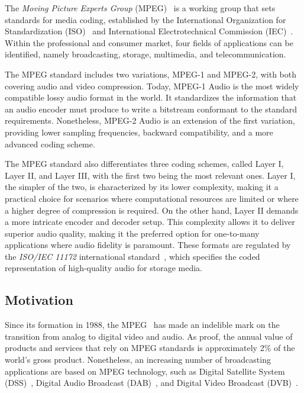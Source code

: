 The \textit{Moving Picture Experts Group} (MPEG)~\cite{MPEG} is a working group that sets standards for media coding, established by the International Organization for Standardization (ISO)~\cite{iso} and International Electrotechnical Commission (IEC)~\cite{iec}. Within the professional and consumer market, four fields of applications can be identified, namely broadcasting, storage, multimedia, and telecommunication.

The MPEG standard includes two variations, MPEG-1 and MPEG-2, with both covering audio and video compression.  Today, MPEG-1 Audio is the most widely compatible lossy audio format in the world. It standardizes the information that an audio encoder must produce to write a bitstream conformant to the standard requirements.  Nonetheless, MPEG-2 Audio is an extension of the first variation, providing lower sampling frequencies, backward compatibility, and a more advanced coding scheme.

The MPEG standard also differentiates three coding schemes, called Layer I, Layer II, and Layer III, with the first two being the most relevant ones. 
Layer I, the simpler of the two, is characterized by its lower complexity, making it a practical choice for scenarios where computational resources are limited or where a higher degree of compression is required.
On the other hand, Layer II demands a more intricate encoder and decoder setup. This complexity allows it to deliver superior audio quality, making it the preferred option for one-to-many applications where audio fidelity is paramount.
These formats are regulated by the \textit{ISO/IEC 11172} international standard~\cite{11172}, which specifies the coded representation of high-quality audio for storage media.

\subsection{Motivation}

Since its formation in 1988, the MPEG~\cite{MPEG} has made an indelible mark on the transition from analog to digital video and audio. As proof, the annual value of products and services that rely on MPEG standards is approximately 2\% of the world's gross product. Nonetheless, an increasing number of broadcasting applications are based on MPEG technology, such as Digital Satellite System (DSS)~\cite{dss}, Digital Audio Broadcast (DAB)~\cite{dab}, and Digital Video Broadcast (DVB)~\cite{dvb}. 

